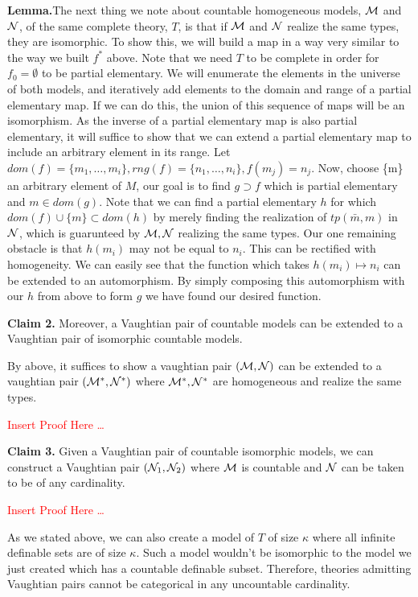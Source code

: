 \textbf{Lemma.}The next thing we note about countable homogeneous models, \(\mathcal{M}\) and \(\mathcal{N}\), of the same complete theory, \(T\), is that if \(\mathcal{M}\) and \(\mathcal{N}\) realize the same types, they are isomorphic.
To show this, we will build a map in a way very similar to the way we built \(f^*\) above. 
Note that we need \(T\) to be complete in order for \(f_0=\emptyset\) to be partial elementary.
We will enumerate the elements in the universe of both models, and iteratively add elements to the domain and range of a partial elementary map. 
If we can do this, the union of this sequence of maps will be an isomorphism.
As the inverse of a partial elementary map is also partial elementary, it will suffice to show that we can extend a partial elementary map to include an arbitrary element in its range. 
Let \(dom(f) = \{m_1, \ldots, m_i\}, rng(f) = \{n_1, \ldots, n_i\}, f(m_j) = n_j\).
Now, choose \{m\} an arbitrary element of \(M\), our goal is to find \(g \supset f\) which is partial elementary and \(m \in dom(g)\).
Note that we can find a partial elementary \(h\) for which \(dom(f) \cup \{m\} \subset dom(h)\) by merely finding the realization of \(tp(\bar{m}, m)\) in \(\mathcal{N}\), which is guarunteed by \(\mathcal{M}, \mathcal{N}\) realizing the same types. 
Our one remaining obstacle is that \(h(m_i)\) may not be equal to \(n_i\). 
This can be rectified with homogeneity. We can easily see that the function which takes \(h(m_i) \mapsto n_i\) can be extended to an automorphism. 
By simply composing this automorphism with our \(h\) from above to form \(g\) we have found our desired function. 


\textbf{Claim 2.} Moreover, a Vaughtian pair of countable models can be extended to a Vaughtian pair of isomorphic countable models.

By above, it suffices to show a vaughtian pair \((\mathcal{M}, \mathcal{N})\) can be extended to a vaughtian pair \((\mathcal{M}^*, \mathcal{N}^*)\) where \(\mathcal{M}^*, \mathcal{N}^*\) are homogeneous and realize the same types. 

\textcolor{red}{Insert Proof Here \ldots}

\textbf{Claim 3.} Given a Vaughtian pair of countable isomorphic models, we can construct a Vaughtian pair \((\mathcal{N}_1, \mathcal{N}_2)\) where \(\mathcal{M}\) is countable and \(\mathcal{N}\) can be taken to be of any cardinality. %

\textcolor{red}{Insert Proof Here \ldots} 

As we stated above, we can also create a model of \(T\) of size \(\kappa\) where all infinite definable sets are of size \(\kappa\). 
Such a model wouldn't be isomorphic to the model we just created which has a countable definable subset. 
Therefore, theories admitting Vaughtian pairs cannot be categorical in any uncountable cardinality.
